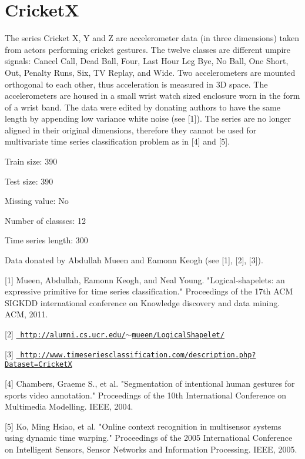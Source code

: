\chapter{CricketX}
\hypertarget{md_external_2data_2UCRArchive__2018_2CricketX_2README}{}\label{md_external_2data_2UCRArchive__2018_2CricketX_2README}
\label{md_external_2data_2UCRArchive__2018_2CricketX_2README_autotoc_md37}%
%
 The series Cricket X, Y and Z are accelerometer data (in three dimensions) taken from actors performing cricket gestures. The twelve classes are different umpire signals\+: Cancel Call, Dead Ball, Four, Last Hour Leg Bye, No Ball, One Short, Out, Penalty Runs, Six, TV Replay, and Wide. Two accelerometers are mounted orthogonal to each other, thus acceleration is measured in 3D space. The accelerometers are housed in a small wrist watch sized enclosure worn in the form of a wrist band. The data were edited by donating authors to have the same length by appending low variance white noise (see \mbox{[}1\mbox{]}). The series are no longer aligned in their original dimensions, therefore they cannot be used for multivariate time series classification problem as in \mbox{[}4\mbox{]} and \mbox{[}5\mbox{]}.

Train size\+: 390

Test size\+: 390

Missing value\+: No

Number of classses\+: 12

Time series length\+: 300

Data donated by Abdullah Mueen and Eamonn Keogh (see \mbox{[}1\mbox{]}, \mbox{[}2\mbox{]}, \mbox{[}3\mbox{]}).

\mbox{[}1\mbox{]} Mueen, Abdullah, Eamonn Keogh, and Neal Young. "{}\+Logical-\/shapelets\+: an expressive primitive for time series classification."{} Proceedings of the 17th ACM SIGKDD international conference on Knowledge discovery and data mining. ACM, 2011.

\mbox{[}2\mbox{]} \href{http://alumni.cs.ucr.edu/~mueen/LogicalShapelet/}{\texttt{ http\+://alumni.\+cs.\+ucr.\+edu/\texorpdfstring{$\sim$}{\string~}mueen/\+Logical\+Shapelet/}}

\mbox{[}3\mbox{]} \href{http://www.timeseriesclassification.com/description.php?Dataset=CricketX}{\texttt{ http\+://www.\+timeseriesclassification.\+com/description.\+php?\+Dataset=\+CricketX}}

\mbox{[}4\mbox{]} Chambers, Graeme S., et al. "{}\+Segmentation of intentional human gestures for sports video annotation."{} Proceedings of the 10th International Conference on Multimedia Modelling. IEEE, 2004.

\mbox{[}5\mbox{]} Ko, Ming Hsiao, et al. "{}\+Online context recognition in multisensor systems using dynamic time warping."{} Proceedings of the 2005 International Conference on Intelligent Sensors, Sensor Networks and Information Processing. IEEE, 2005. 